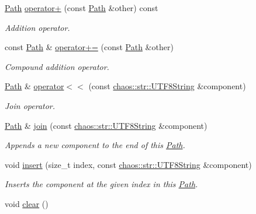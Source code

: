 \begin{DoxyCompactItemize}
\hyperlink{classchaos_1_1io_1_1file_1_1_path}{Path} \hyperlink{classchaos_1_1io_1_1file_1_1_path_aa50a4cd5e59861d5f92050e13fb1a9ce}{operator+} (const \hyperlink{classchaos_1_1io_1_1file_1_1_path}{Path} \&other) const 
\begin{DoxyCompactList}\small\item\em Addition operator. \end{DoxyCompactList}\item 
const \hyperlink{classchaos_1_1io_1_1file_1_1_path}{Path} \& \hyperlink{classchaos_1_1io_1_1file_1_1_path_a6b89728f3dc58d20f21d3d5b6557ae2b}{operator+=} (const \hyperlink{classchaos_1_1io_1_1file_1_1_path}{Path} \&other)
\begin{DoxyCompactList}\small\item\em Compound addition operator. \end{DoxyCompactList}\item 
\hyperlink{classchaos_1_1io_1_1file_1_1_path}{Path} \& \hyperlink{classchaos_1_1io_1_1file_1_1_path_ac387ee9adf8455686998c392eebae4a8}{operator$<$$<$} (const \hyperlink{classchaos_1_1str_1_1_u_t_f8_string}{chaos\+::str\+::\+U\+T\+F8\+String} \&component)
\begin{DoxyCompactList}\small\item\em Join operator. \end{DoxyCompactList}\item 
\hyperlink{classchaos_1_1io_1_1file_1_1_path}{Path} \& \hyperlink{classchaos_1_1io_1_1file_1_1_path_a94c5bfc90cdbf2096962f1bf03c9be7c}{join} (const \hyperlink{classchaos_1_1str_1_1_u_t_f8_string}{chaos\+::str\+::\+U\+T\+F8\+String} \&component)
\begin{DoxyCompactList}\small\item\em Appends a new component to the end of this \hyperlink{classchaos_1_1io_1_1file_1_1_path}{Path}. \end{DoxyCompactList}\item 
void \hyperlink{classchaos_1_1io_1_1file_1_1_path_a974a945f9c1971eddf672717ea32ac3d}{insert} (size\+\_\+t index, const \hyperlink{classchaos_1_1str_1_1_u_t_f8_string}{chaos\+::str\+::\+U\+T\+F8\+String} \&component)
\begin{DoxyCompactList}\small\item\em Inserts the component at the given index in this \hyperlink{classchaos_1_1io_1_1file_1_1_path}{Path}. \end{DoxyCompactList}\item 
void \hyperlink{classchaos_1_1io_1_1file_1_1_path_a3643cb2fd2fa2ee7aefaa1046299cd84}{clear} ()

\end{DoxyCompactItemize}
